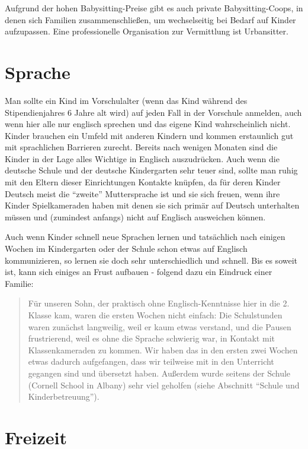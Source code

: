 \documentclass[a4paper]{scrreprt}
\begin{document}
Aufgrund der hohen Babysitting-Preise gibt es auch private Babysitting-Coops, in denen sich Familien zusammenschließen, um wechselseitig bei Bedarf auf Kinder aufzupassen.
Eine professionelle Organisation zur Vermittlung ist Urbansitter.

\section{Sprache}

Man sollte ein Kind im Vorschulalter (wenn das Kind während des Stipendienjahres 6 Jahre alt wird) auf jeden Fall in der Vorschule anmelden, auch wenn hier alle nur englisch sprechen und das eigene Kind wahrscheinlich nicht. Kinder brauchen ein Umfeld mit anderen Kindern und kommen erstaunlich gut mit sprachlichen Barrieren zurecht. Bereits nach wenigen Monaten sind die Kinder in der Lage alles Wichtige in Englisch auszudrücken. Auch wenn die deutsche Schule und der deutsche Kindergarten sehr teuer sind, sollte man ruhig mit den Eltern dieser Einrichtungen Kontakte knüpfen, da für deren Kinder Deutsch meist die "`zweite"' Muttersprache ist und sie sich freuen, wenn ihre Kinder Spielkameraden haben mit denen sie sich primär auf Deutsch unterhalten müssen und (zumindest anfangs) nicht auf Englisch ausweichen können.

Auch wenn Kinder schnell neue Sprachen lernen und tatsächlich nach einigen Wochen im Kindergarten oder der Schule schon etwas auf Englisch kommunizieren, so lernen sie doch sehr unterschiedlich und schnell. Bis es soweit ist, kann sich einiges an Frust aufbauen - folgend dazu ein Eindruck einer Familie:

\begin{verse}
Für unseren Sohn, der praktisch ohne Englisch-Kenntnisse hier in die 2. Klasse kam, waren die ersten Wochen nicht einfach: Die Schulstunden waren zunächst langweilig, weil er kaum etwas verstand, und die Pausen frustrierend, weil es ohne die Sprache schwierig war, in Kontakt mit Klassenkameraden zu kommen. Wir haben das in den ersten zwei Wochen etwas dadurch aufgefangen, dass wir teilweise mit in den Unterricht gegangen sind und übersetzt haben. Außerdem wurde seitens der Schule (Cornell School in Albany) sehr viel geholfen (siehe Abschnitt "`Schule und Kinderbetreuung"').
\end{verse}

\section{Freizeit}
\end{document}
